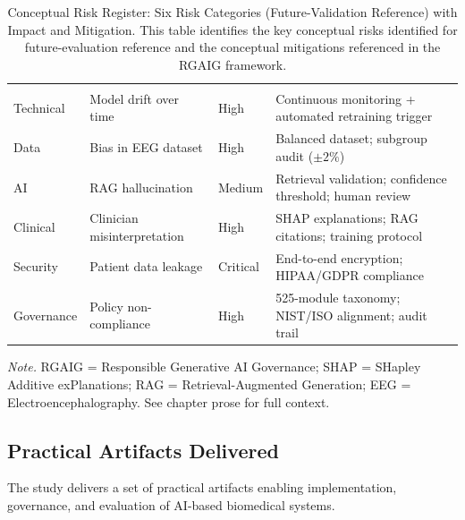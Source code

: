{\tablestripes\tablefontsize
\begin{xltabular}{\textwidth}{@{} >{\raggedright\arraybackslash}p{1.8cm} >{\raggedright\arraybackslash}p{2.5cm} >{\centering\arraybackslash}p{1.5cm} L @{}}
\caption[Conceptual Risk Register: Six Risk Categories (Future-Validation Reference) with]{Conceptual Risk Register: Six Risk Categories (Future-Validation Reference) with Impact and Mitigation. This table identifies the key conceptual risks identified for future-evaluation reference and the conceptual mitigations referenced in the RGAIG framework.}\label{tab:ch5_risk_register} \\
\toprule
{} &  &  &  \\
\midrule
\endfirsthead
\toprule
{} &  &  &  \\
\midrule
\endhead
\bottomrule
\endlastfoot
Technical & Model drift over time & High & Continuous monitoring + automated retraining trigger \\
\addlinespace
Data & Bias in EEG dataset & High & Balanced dataset; subgroup audit ($\pm 2\%$) \\
\addlinespace
AI & RAG hallucination & Medium & Retrieval validation; confidence threshold; human review \\
\addlinespace
Clinical & Clinician misinterpretation & High & SHAP explanations; RAG citations; training protocol \\
\addlinespace
Security & Patient data leakage & Critical & End-to-end encryption; HIPAA/GDPR compliance \\
\addlinespace
Governance & Policy non-compliance & High & 525-module taxonomy; NIST/ISO alignment; audit trail \\
\end{xltabular}}
\vspace{0.3em}\noindent\textit{Note.} RGAIG = Responsible Generative AI Governance; SHAP = SHapley Additive exPlanations; RAG = Retrieval-Augmented Generation; EEG = Electroencephalography. See chapter prose for full context.

\subsection{Practical Artifacts Delivered}

The study delivers a set of practical artifacts enabling implementation, governance, and evaluation of AI-based biomedical systems.

